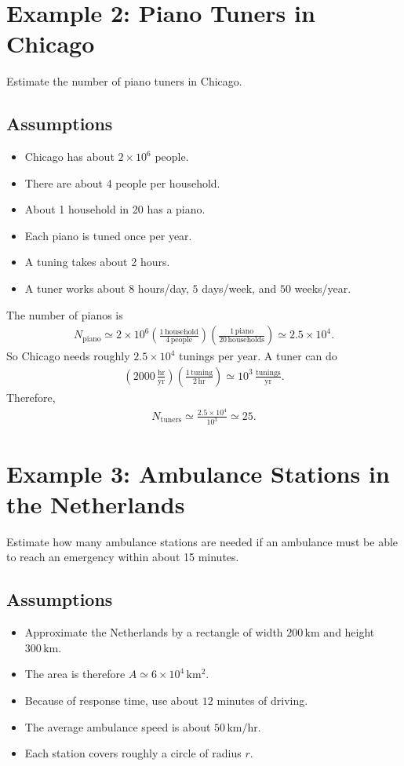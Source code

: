 \documentclass[12pt]{article}
\newcommand{\be}{\begin{eqnarray}}
\newcommand{\ee}{\end{eqnarray}}
\begin{document}
\section{Example 2: Piano Tuners in Chicago}
Estimate the number of piano tuners in Chicago.

\subsection*{Assumptions}
\begin{itemize}
    \item Chicago has about $2\times 10^6$ people.
    \item There are about 4 people per household.
    \item About 1 household in 20 has a piano.
    \item Each piano is tuned once per year.
    \item A tuning takes about 2 hours.
    \item A tuner works about $8$ hours/day, $5$ days/week, and $50$ weeks/year.
\end{itemize}

The number of pianos is
\be
N_{\mathrm{piano}}
\simeq
2\times 10^6
\left(\frac{1\,\mathrm{household}}{4\,\mathrm{people}}\right)
\left(\frac{1\,\mathrm{piano}}{20\,\mathrm{households}}\right)
\simeq 2.5\times 10^4.
\ee
So Chicago needs roughly $2.5\times 10^4$ tunings per year. A tuner can do
\be
\left(2000\,\frac{\mathrm{hr}}{\mathrm{yr}}\right)
\left(\frac{1\,\mathrm{tuning}}{2\,\mathrm{hr}}\right)
\simeq 10^3\,\frac{\mathrm{tunings}}{\mathrm{yr}}.
\ee
Therefore,
\be
N_{\mathrm{tuners}}
\simeq \frac{2.5\times 10^4}{10^3}
\simeq 25.
\ee

\section{Example 3: Ambulance Stations in the Netherlands}
Estimate how many ambulance stations are needed if an ambulance must be able to reach an emergency within about 15 minutes.

\subsection*{Assumptions}
\begin{itemize}
    \item Approximate the Netherlands by a rectangle of width $200\,\mathrm{km}$ and height $300\,\mathrm{km}$.
    \item The area is therefore $A\simeq 6\times 10^4\,\mathrm{km^2}$.
    \item Because of response time, use about $12$ minutes of driving.
    \item The average ambulance speed is about $50\,\mathrm{km/hr}$.
    \item Each station covers roughly a circle of radius $r$.
\end{itemize}
\end{document}
